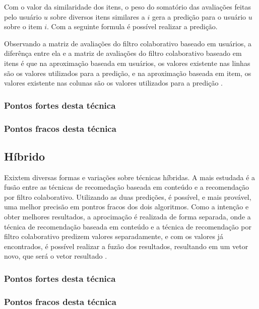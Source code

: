 \documentclass[12pt,
				openright,
				twoside,
				a4paper,
				apter=TITLE,
				section=TITLE,
				subsection=TITLE,
				chapter=TITLE,
				english,
				french,
				spanish,
				brazil]{abntex2}
\begin{document}

Com o valor da similaridade dos itens, o peso do somatório das avaliações feitas pelo usuário $u$ sobre diversos itens similares a $i$ gera a predição para o usuário $u$ sobre o item $i$. Com a seguinte formula é possível realizar a predição.


Observando a matriz de avaliações do filtro colaborativo baseado em usuários, a diferênça entre ela e a matriz de avaliações do filtro colaborativo baseado em itens é que na aproximação baseada em usuários, os valores existente nas linhas são os valores utilizados para a predição, e na aproximação baseada em item, os valores existente nas colunas são os valores utilizados para a predição \cite{sarwar2001item}. 


\subsubsection{Pontos fortes desta técnica}

\subsubsection{Pontos fracos desta técnica}


\subsection{Híbrido}
Exixtem diversas formas e variações sobre técnicas híbridas. A mais estudada é a fusão entre as técnicas de recomedação baseada em conteúdo e a recomendação por filtro colaborativo. Utilizando as duas predições, é possível, e mais provável, uma melhor precisão em pontros fracos dos dois algoritmos. Como a intenção e obter melhores resultados, a aprocimação é realizada de forma separada, onde a técnica de recomendação baseada em conteúdo e a técnica de recomendação por filtro colaborativo predizem valores separadamente, e com os valores já encontrados, é possível realizar a fuzão dos resultados, resultando em um vetor novo, que será o vetor resultado \cite{melville2010recommender}.

\subsubsection{Pontos fortes desta técnica}

\subsubsection{Pontos fracos desta técnica}
\end{document}
